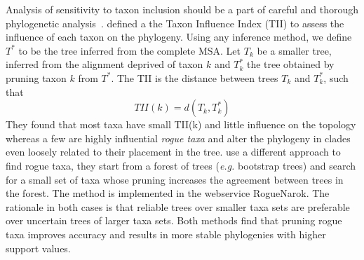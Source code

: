 Analysis of sensitivity to taxon inclusion should be a part of careful and thorough phylogenetic analysis~\citep{Heath2008}. \citet{Mariadassou2012} defined a the Taxon Influence Index (TII) to assess the influence of each taxon on the phylogeny. Using any inference method, we define $T^*$ to be the tree inferred from the complete MSA. Let $T_k$ be a smaller tree, inferred from the
alignment deprived of taxon $k$ and $T_k^*$ the tree obtained by pruning taxon $k$ from $T^*$. 
The TII is the distance between trees $T_k$ and $T_k^*$, such that 
\[
TII(k) = d(T_k , T_k^*) 
\]
They found that most taxa have small TII(k) and little influence on the topology whereas a few are highly influential \emph{rogue taxa} and alter the phylogeny in clades even loosely related to their placement in the tree. \citet{Aberer2013} use a different approach to find rogue taxa, they start from a forest of trees (\emph{e.g.} bootstrap trees) and search for a small set of taxa whose pruning increases the agreement between trees in the forest. The method is implemented in the webservice RogueNarok. The rationale in both cases is that reliable trees over smaller taxa sets are preferable over uncertain trees of larger taxa sets. Both methods find that pruning rogue taxa improves accuracy and results in more stable phylogenies with higher support values. 